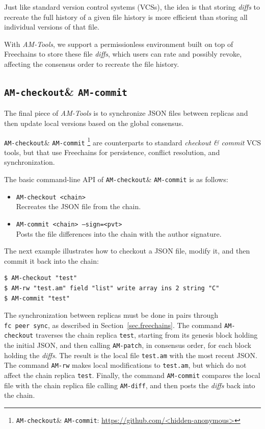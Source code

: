 \documentclass[12pt]{article}
\newcommand{\AMT}      {\emph{AM-Tools}\xspace}
\newcommand{\code}[1]  {\texttt{\footnotesize{#1}}}
\newcommand{\amcheckout} {\texttt{AM-checkout}\xspace}
\newcommand{\amcommit}   {\texttt{AM-commit}\xspace}
\begin{document}
Just like standard version control systems (VCSs), the idea is that storing
\emph{diffs} to recreate the full history of a given file history is more
efficient than storing all individual versions of that file.

With \AMT, we support a permissionless environment built on top of Freechains
to store these file \emph{diffs}, which users can rate and possibly revoke,
affecting the consensus order to recreate the file history.

\subsection{\amcheckout \& \amcommit}

The final piece of \AMT is to synchronize JSON files between replicas
and then update local versions based on the global consensus.

\amcheckout \& \amcommit%
    \footnote{\amcheckout \& \amcommit: \url{https://github.com/<hidden-anonymous>}}
are counterparts to standard \emph{checkout \& commit} VCS tools, but that use
Freechains for persistence, conflict resolution, and synchronization.

The basic command-line API of \amcheckout \& \amcommit is as follows:

\begin{itemize}
\item \code{AM-checkout <chain>} \\
    Recreates the JSON file from the chain.
\item \code{AM-commit <chain> --sign=<pvt>} \\
    Posts the file differences into the chain with the author signature.
\end{itemize}

The next example illustrates how to checkout a JSON file, modify it, and then
commit it back into the chain:

{\footnotesize
\begin{verbatim}
$ AM-checkout "test"
$ AM-rw "test.am" field "list" write array ins 2 string "C"
$ AM-commit "test"
\end{verbatim}
}

The synchronization between replicas must be done in pairs through
\code{fc~peer~sync}, as described in Section~\ref{sec.freechains}.
%
The command \code{AM-checkout} traverses the chain replica \code{test},
starting from its genesis block holding the initial JSON, and then calling
\code{AM-patch}, in consensus order, for each block holding the \emph{diffs}.
The result is the local file \code{test.am} with the most recent JSON.
%
The command \code{AM-rw} makes local modifications to \code{test.am}, but which
do not affect the chain replica \code{test}.
%
Finally, the command \code{AM-commit} compares the local file with the chain
replica file calling \code{AM-diff}, and then posts the \emph{diffs} back into
the chain.
\end{document}
